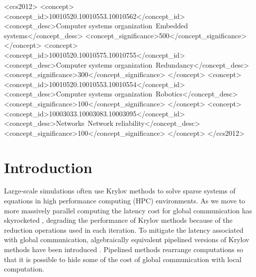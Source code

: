 \documentclass[sigconf, anonymous]{acmart}
\begin{document}
%
%
\begin{CCSXML}
<ccs2012>
 <concept>
  <concept_id>10010520.10010553.10010562</concept_id>
  <concept_desc>Computer systems organization~Embedded systems</concept_desc>
  <concept_significance>500</concept_significance>
 </concept>
 <concept>
  <concept_id>10010520.10010575.10010755</concept_id>
  <concept_desc>Computer systems organization~Redundancy</concept_desc>
  <concept_significance>300</concept_significance>
 </concept>
 <concept>
  <concept_id>10010520.10010553.10010554</concept_id>
  <concept_desc>Computer systems organization~Robotics</concept_desc>
  <concept_significance>100</concept_significance>
 </concept>
 <concept>
  <concept_id>10003033.10003083.10003095</concept_id>
  <concept_desc>Networks~Network reliability</concept_desc>
  <concept_significance>100</concept_significance>
 </concept>
</ccs2012>
\end{CCSXML}


%

\maketitle

\section{Introduction}


Large-scale simulations often use Krylov methods \cite{saad96iterative} to solve sparse systems of equations in high performance computing (HPC) environments. 
As we move to more massively parallel computing the latency cost for global communication has skyrocketed \cite{HPCChallenge}, degrading the performance of Krylov methods because of the reduction operations used in each iteration.
To mitigate the latency associated with global communication, algebraically equivalent pipelined versions of Krylov methods have been introduced 
\cite{Chronopoulos_Gear_1989, Ghysels_Ashby_Meerbergen_Vanroose_2012, GhyselsVanroose2014, StrzodkaGoddeke06, Sturler_Vorst_1995, JacquesNicolasVollaire12}. 
Pipelined methods rearrange computations so that it is possible to hide some of the cost of global communication with local computation. 
\end{document}
